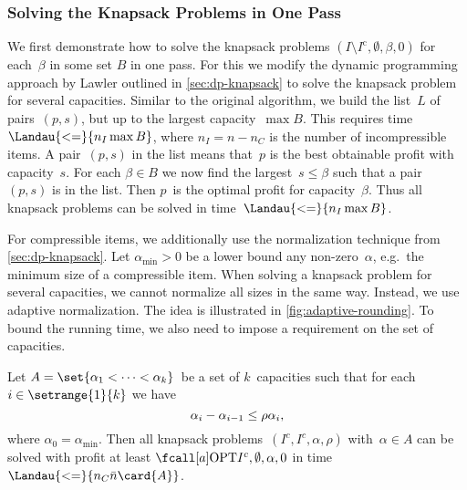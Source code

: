 \subsubsection{Solving the Knapsack Problems in One Pass}
\label{sec:one-pass}

We first demonstrate how to solve the knapsack problems $(I \setminus I^\mathrm{c}, \emptyset, \beta, 0)$
for each~$\beta$ in some set $B$ in one pass.
For this we modify the dynamic programming approach by Lawler outlined in \cref{sec:dp-knapsack}
to solve the knapsack problem for several capacities.
Similar to the original algorithm, we build the list~$L$ of pairs~$(p, s)$,
but up to the largest capacity~$\max B$.
This requires time~$\Landau{<=}{n_I \max B}$,
where $n_I = n - n_C$ is the number of incompressible items.
A pair~$(p, s)$ in the list means that~$p$ is the best obtainable profit with capacity~$s$. 
For each $\beta \in B$ we now find the largest~$s \leq \beta$
such that a pair~$(p, s)$ is in the list.
Then $p$~is the optimal profit for capacity~$\beta$.
Thus all knapsack problems can be solved in time~$\Landau{<=}{n_I \max B}$.

For compressible items,
we additionally use the normalization technique from \cref{sec:dp-knapsack}.
Let $\alpha_{\min} > 0$ be a lower bound any non-zero~$\alpha$,
e.g.~the minimum size of a compressible item.
When solving a knapsack problem for several capacities, we cannot normalize all sizes in the same way.
Instead, we use adaptive normalization.
The idea is illustrated in \cref{fig:adaptive-rounding}.
To bound the running time, we also need to impose a requirement on the set of capacities.

\begin{lemma}
  \label{thm:adaptive-rounding}
  Let $A = \set{\alpha_1 < \cdots < \alpha_k}$~be a set of $k$~capacities such that
  for each $i \in \setrange{1}{k}$ we have
  \begin{equation}
    \label{eq:gap-alpha}
    \alpha_i - \alpha_{i-1} \leq \rho \alpha_i \text{,}
  \end{equation}
  where $\alpha_0 = \alpha_{\min}$.
  Then all knapsack problems~$(I^c, I^c, \alpha, \rho)$ with~$\alpha \in A$ can be solved 
  with profit at least $\KPCOPT{I^c, \emptyset, \alpha, 0}$
  in time~$\Landau{<=}{n_C \bar{n} \card{A}}$.
\end{lemma}

